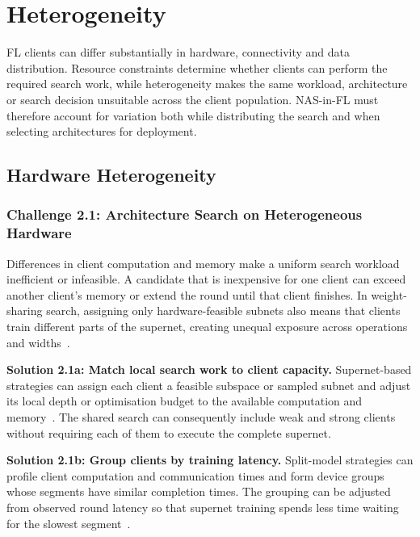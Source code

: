 \section{Heterogeneity}

FL clients can differ substantially in hardware, connectivity and data distribution. Resource constraints determine whether clients can perform the required search work, while heterogeneity makes the same workload, architecture or search decision unsuitable across the client population. NAS-in-FL must therefore account for variation both while distributing the search and when selecting architectures for deployment.

\subsection{Hardware Heterogeneity}

\subsubsection{Challenge 2.1: Architecture Search on Heterogeneous Hardware}

Differences in client computation and memory make a uniform search workload inefficient or infeasible. A candidate that is inexpensive for one client can exceed another client's memory or extend the round until that client finishes. In weight-sharing search, assigning only hardware-feasible subnets also means that clients train different parts of the supernet, creating unequal exposure across operations and widths~\cite{fedoras_2022,peaches_2024,supernet_trade-off_fednas_2025}.

\noindent\textbf{Solution 2.1a: Match local search work to client capacity.} Supernet-based strategies can assign each client a feasible subspace or sampled subnet and adjust its local depth or optimisation budget to the available computation and memory~\cite{fedoras_2022,apons_2023,divide-and-conquer_fednas_2023,peaches_2024,fgfl_2024,supernet_trade-off_fednas_2025}. The shared search can consequently include weak and strong clients without requiring each of them to execute the complete supernet.

\noindent\textbf{Solution 2.1b: Group clients by training latency.} Split-model strategies can profile client computation and communication times and form device groups whose segments have similar completion times. The grouping can be adjusted from observed round latency so that supernet training spends less time waiting for the slowest segment~\cite{nasfly_2024}.

